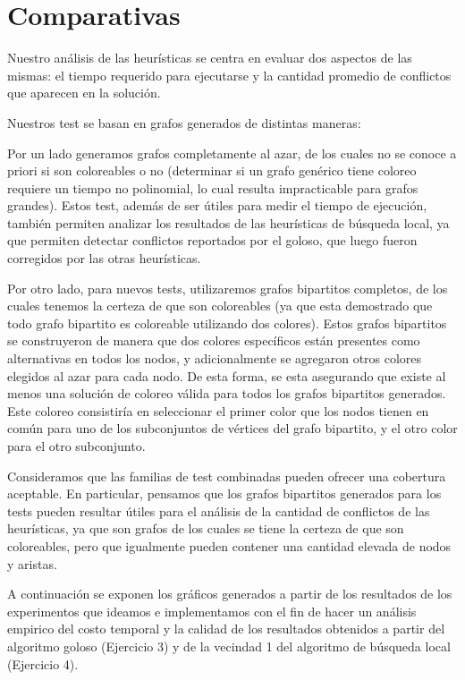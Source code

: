 \section{Comparativas}
Nuestro análisis de las heurísticas se centra en evaluar dos aspectos de las mismas: el tiempo requerido para ejecutarse y la cantidad promedio de conflictos que aparecen en la solución.


Nuestros test se basan en grafos generados de distintas maneras:

Por un lado generamos grafos completamente al azar, de los cuales no se conoce a priori si son coloreables o no (determinar si un grafo genérico tiene coloreo requiere un tiempo no polinomial, lo cual resulta impracticable para grafos grandes). Estos test, además de ser útiles para medir el tiempo de ejecución, también permiten analizar los resultados de las heurísticas de búsqueda local, ya que permiten detectar conflictos reportados por el goloso, que luego fueron corregidos por las otras heurísticas.

Por otro lado, para nuevos tests, utilizaremos grafos bipartitos completos, de los cuales tenemos la certeza de que son coloreables (ya que esta demostrado que todo grafo bipartito es coloreable utilizando dos colores). Estos grafos bipartitos se construyeron de manera que dos colores específicos están presentes como alternativas en todos los nodos,  y adicionalmente se agregaron otros colores elegidos al azar para cada nodo. De esta forma, se esta asegurando que existe al menos una solución de coloreo válida para todos los grafos bipartitos generados. Este coloreo consistiría en seleccionar el primer color que los nodos tienen en común para uno de los subconjuntos de vértices del grafo bipartito, y el otro color para el otro subconjunto.

Consideramos que las familias de test combinadas pueden ofrecer una cobertura aceptable.
En particular, pensamos que los grafos bipartitos generados para los tests pueden resultar útiles para el análisis de la cantidad de conflictos de las heurísticas, ya que son grafos de los cuales se tiene la certeza de que son coloreables, pero que igualmente pueden contener una cantidad elevada de nodos y aristas.

A continuación se exponen los gráficos generados a partir de los resultados de los experimentos que ideamos e implementamos con el fin de hacer un análisis empirico del costo temporal y la calidad de los resultados obtenidos a partir del algoritmo goloso (Ejercicio 3) y de la vecindad 1 del algoritmo de búsqueda local (Ejercicio 4). 

